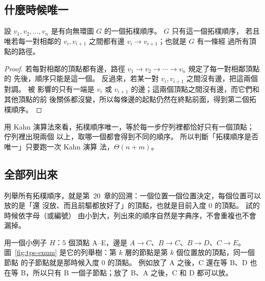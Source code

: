 \subsection{什麼時候唯一}

\begin{theorem}
\label{thm:tps-unique}
設 $v_1, v_2, \ldots, v_n$ 是有向無環圖 $G$ 的一個拓樸順序。 $G$ 只有這一個拓樸順序，
若且唯若每一對相鄰的 $v_i, v_{i+1}$ 之間都有邊 $v_i \to v_{i+1}$；也就是 $G$ 有一條經
過所有頂點的路徑。
\end{theorem}

\begin{proof}
若每對相鄰的頂點都有邊，路徑 $v_1 \to v_2 \to \cdots \to v_n$ 規定了每一對相鄰頂點的
先後，順序只能是這一個。 反過來，若某一對 $v_i, v_{i+1}$ 之間沒有邊，把這兩個對調。 被
影響的只有一端是 $v_i$ 或 $v_{i+1}$ 的邊；這兩個頂點之間沒有邊，而它們和其他頂點的前
後關係都沒變，所以每條邊的起點仍然在終點前面，得到第二個拓樸順序。
\end{proof}

用 Kahn 演算法來看，拓樸順序唯一，等於每一步佇列裡都恰好只有一個頂點；佇列裡出現兩個
以上，取哪一個都會得到不同的順序。 所以判斷「拓樸順序是否唯一」只要跑一次 Kahn 演算
法，$\Theta(n + m)$。

\subsection{全部列出來}

列舉所有拓樸順序，就是第~20~章的回溯：一個位置一個位置決定，每個位置可以放的是「還
沒放、而且前驅都放好了」的頂點，也就是目前入度 $0$ 的頂點。 試的時候依字母（或編號）
由小到大，列出來的順序自然是字典序，不會重複也不會漏掉。

用一個小例子 $H$：$5$ 個頂點 A--E，邊是 $A \to C$、$B \to C$、$B \to D$、$C \to E$。
圖~\ref{fig:tps-enum} 是它的列舉樹：第 $k$ 層的節點是第 $k$ 個位置放的頂點，同一個節點
的子節點就是那時候入度 $0$ 的頂點。 例如放了 A 之後，C 還在等 B、D 也在等 B，所以只有
B 一個子節點；放了 B、A 之後，C 和 D 都可以放。

